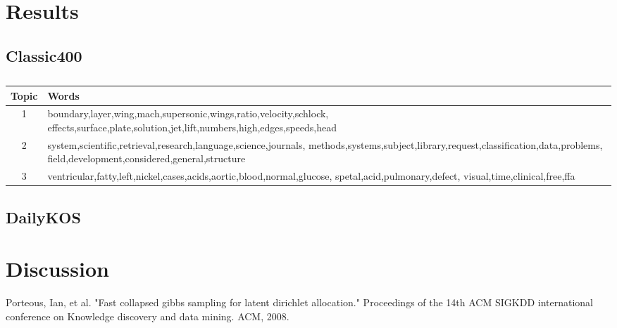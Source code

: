 \documentclass[twoside,12pt]{article}
\begin{document}
\section{Results}
\clearpage
\subsection{Classic400}

\begin{table}[!]
\vspace{-2cm}
\begin{center}
\begin{tabular}{| c | p{12cm} |}
\hline
\textbf{Topic}& \textbf{Words}  \\ \hline
1&boundary,layer,wing,mach,supersonic,wings,ratio,velocity,schlock, effects,surface,plate,solution,jet,lift,numbers,high,edges,speeds,head\\ \hline
2&system,scientific,retrieval,research,language,science,journals, methods,systems,subject,library,request,classification,data,problems, field,development,considered,general,structure\\
 \hline
3&ventricular,fatty,left,nickel,cases,acids,aortic,blood,normal,glucose, spetal,acid,pulmonary,defect, visual,time,clinical,free,ffa\\
 \hline
 
\end{tabular}
\caption{}\label{table:2}
\end{center}
\end{table}


\subsection{DailyKOS}

\section{Discussion}


\begin{thebibliography}{9}
Porteous, Ian, et al. "Fast collapsed gibbs sampling for latent dirichlet allocation." Proceedings of the 14th ACM SIGKDD international conference on Knowledge discovery and data mining. ACM, 2008.

\end{thebibliography}
\end{document}
